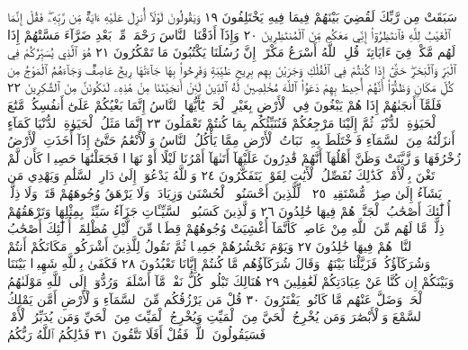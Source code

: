 سَبَقَتْ مِن رَّبِّكَ لَقُضِيَ بَيْنَهُمْ فِيمَا فِيهِ يَخْتَلِفُونَ ١٩
وَيَقُولُونَ لَوْلَآ أُنزِلَ عَلَيْهِ ءَايَةࣱ مِّن رَّبِّهِۦۖ فَقُلْ إِنَّمَا
ٱلْغَيْبُ لِلَّهِ فَٱنتَظِرُوٓا۟ إِنِّي مَعَكُم مِّنَ ٱلْمُنتَظِرِينَ ٢٠
وَإِذَآ أَذَقْنَا ٱلنَّاسَ رَحْمَةࣰ مِّنۢ بَعْدِ ضَرَّآءَ مَسَّتْهُمْ إِذَا لَهُم مَّكْرࣱ
فِيٓ ءَايَاتِنَاۚ قُلِ ٱللَّهُ أَسْرَعُ مَكْرًاۚ إِنَّ رُسُلَنَا يَكْتُبُونَ مَا تَمْكُرُونَ ٢١
هُوَ ٱلَّذِي يُسَيِّرُكُمْ فِي ٱلْبَرِّ وَٱلْبَحْرِۖ حَتَّىٰٓ إِذَا كُنتُمْ فِي ٱلْفُلْكِ
وَجَرَيْنَ بِهِم بِرِيحࣲ طَيِّبَةࣲ وَفَرِحُوا۟ بِهَا جَآءَتْهَا رِيحٌ عَاصِفࣱ
وَجَآءَهُمُ ٱلْمَوْجُ مِن كُلِّ مَكَانࣲ وَظَنُّوٓا۟ أَنَّهُمْ أُحِيطَ بِهِمْ
دَعَوُا۟ ٱللَّهَ مُخْلِصِينَ لَهُ ٱلدِّينَ لَئِنْ أَنجَيْتَنَا مِنْ هَٰذِهِۦ لَنَكُونَنَّ
مِنَ ٱلشَّٰكِرِينَ ٢٢ فَلَمَّآ أَنجَىٰهُمْ إِذَا هُمْ يَبْغُونَ فِي ٱلْأَرْضِ بِغَيْرِ
ٱلْحَقِّۗ يَٰٓأَيُّهَا ٱلنَّاسُ إِنَّمَا بَغْيُكُمْ عَلَىٰٓ أَنفُسِكُمۖ مَّتَٰعَ ٱلْحَيَوٰةِ
ٱلدُّنْيَاۖ ثُمَّ إِلَيْنَا مَرْجِعُكُمْ فَنُنَبِّئُكُم بِمَا كُنتُمْ تَعْمَلُونَ ٢٣
إِنَّمَا مَثَلُ ٱلْحَيَوٰةِ ٱلدُّنْيَا كَمَآءٍ أَنزَلْنَٰهُ مِنَ ٱلسَّمَآءِ فَٱخْتَلَطَ
بِهِۦ نَبَاتُ ٱلْأَرْضِ مِمَّا يَأْكُلُ ٱلنَّاسُ وَٱلْأَنْعَٰمُ حَتَّىٰٓ إِذَآ
أَخَذَتِ ٱلْأَرْضُ زُخْرُفَهَا وَٱزَّيَّنَتْ وَظَنَّ أَهْلُهَآ أَنَّهُمْ قَٰدِرُونَ
عَلَيْهَآ أَتَىٰهَآ أَمْرُنَا لَيْلًا أَوْ نَهَارࣰا فَجَعَلْنَٰهَا حَصِيدࣰا كَأَن لَّمْ تَغْنَ
بِٱلْأَمْسِۚ كَذَٰلِكَ نُفَصِّلُ ٱلْأٓيَٰتِ لِقَوْمࣲ يَتَفَكَّرُونَ ٢٤ وَٱللَّهُ يَدْعُوٓا۟
إِلَىٰ دَارِ ٱلسَّلَٰمِ وَيَهْدِي مَن يَشَآءُ إِلَىٰ صِرَٰطࣲ مُّسْتَقِيمࣲ ٢٥
۞ لِّلَّذِينَ أَحْسَنُوا۟ ٱلْحُسْنَىٰ وَزِيَادَةࣱۖ وَلَا يَرْهَقُ وُجُوهَهُمْ قَتَرࣱ
وَلَا ذِلَّةٌۚ أُو۟لَٰٓئِكَ أَصْحَٰبُ ٱلْجَنَّةِۖ هُمْ فِيهَا خَٰلِدُونَ ٢٦ وَٱلَّذِينَ
كَسَبُوا۟ ٱلسَّيِّـَٔاتِ جَزَآءُ سَيِّئَةِۭ بِمِثْلِهَا وَتَرْهَقُهُمْ ذِلَّةࣱۖ مَّا لَهُم
مِّنَ ٱللَّهِ مِنْ عَاصِمࣲۖ كَأَنَّمَآ أُغْشِيَتْ وُجُوهُهُمْ قِطَعࣰا مِّنَ ٱلَّيْلِ
مُظْلِمًاۚ أُو۟لَٰٓئِكَ أَصْحَٰبُ ٱلنَّارِۖ هُمْ فِيهَا خَٰلِدُونَ ٢٧ وَيَوْمَ نَحْشُرُهُمْ
جَمِيعࣰا ثُمَّ نَقُولُ لِلَّذِينَ أَشْرَكُوا۟ مَكَانَكُمْ أَنتُمْ وَشُرَكَآؤُكُمْۚ فَزَيَّلْنَا
بَيْنَهُمْۖ وَقَالَ شُرَكَآؤُهُم مَّا كُنتُمْ إِيَّانَا تَعْبُدُونَ ٢٨ فَكَفَىٰ بِٱللَّهِ
شَهِيدَۢا بَيْنَنَا وَبَيْنَكُمْ إِن كُنَّا عَنْ عِبَادَتِكُمْ لَغَٰفِلِينَ ٢٩
هُنَالِكَ تَبْلُوا۟ كُلُّ نَفْسࣲ مَّآ أَسْلَفَتْۚ وَرُدُّوٓا۟ إِلَى ٱللَّهِ مَوْلَىٰهُمُ
ٱلْحَقِّۖ وَضَلَّ عَنْهُم مَّا كَانُوا۟ يَفْتَرُونَ ٣٠ قُلْ مَن يَرْزُقُكُم مِّنَ
ٱلسَّمَآءِ وَٱلْأَرْضِ أَمَّن يَمْلِكُ ٱلسَّمْعَ وَٱلْأَبْصَٰرَ وَمَن يُخْرِجُ
ٱلْحَيَّ مِنَ ٱلْمَيِّتِ وَيُخْرِجُ ٱلْمَيِّتَ مِنَ ٱلْحَيِّ وَمَن يُدَبِّرُ ٱلْأَمْرَۚ
فَسَيَقُولُونَ ٱللَّهُۚ فَقُلْ أَفَلَا تَتَّقُونَ ٣١ فَذَٰلِكُمُ ٱللَّهُ رَبُّكُمُ
